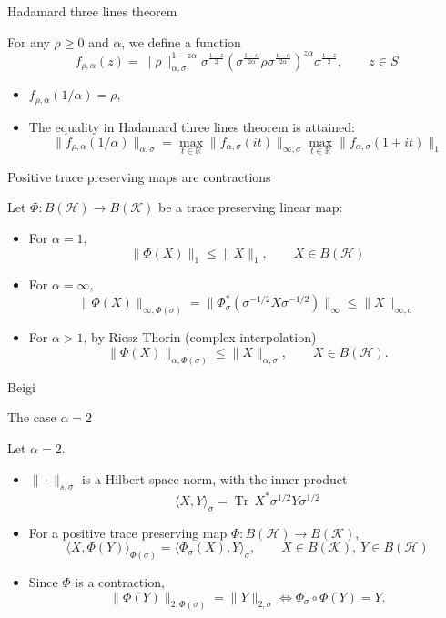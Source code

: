 \documentclass[mathserif]{beamer}
\newcommand{\<}{\langle}
\renewcommand{\>}{\rangle}
\newcommand{\Tr}{\operatorname{Tr}\,}
\newcommand{\Ha}{\mathcal H}
\newcommand{\Ka}{\mathcal K}
\begin{document}
\begin{frame}{Hadamard three lines theorem}

 For any $\rho\ge 0$  and $\alpha$, we define a function 
\[
f_{\rho,\alpha}(z)=
\|\rho\|_{\alpha,\sigma}^{1-z\alpha}\sigma^{\frac{1-z}2}\left(\sigma^{\frac{1-\alpha}{2\alpha}}\rho\sigma^{\frac{1-\alpha}{2\alpha}}\right)^{z\alpha}\sigma^{\frac{1-z}2},\qquad
z\in S
\]

\begin{itemize}
\item $f_{\rho,\alpha}(1/\alpha)=\rho$,
\item The equality in Hadamard three lines theorem is attained:
\[
\|f_{\rho,\alpha}(1/\alpha)\|_{\alpha,\sigma}= \max_{t\in \mathbb R}
\|f_{\alpha,\sigma}(it)\|_{\infty,\sigma}\max_{t\in \mathbb
R}\|f_{\alpha,\sigma}(1+it)\|_1
\]

\end{itemize}


\end{frame}

\begin{frame}{Positive trace preserving maps are contractions}

Let $\Phi:B(\Ha)\to B(\Ka)$ be a  trace preserving linear map:
\bigskip

\begin{itemize}
\item For $\alpha=1$,
\[
\|\Phi(X)\|_1\le \|X\|_1,\qquad X\in B(\Ha)
\]
\item For $\alpha=\infty$,
\[
\|\Phi(X)\|_{\infty,\Phi(\sigma)}=\|\Phi_\sigma^*(\sigma^{-1/2}X\sigma^{-1/2})\|_{\infty}\le
\|X\|_{\infty,\sigma}
\]
\item For $\alpha>1$, by Riesz-Thorin (complex interpolation)
\[
\|\Phi(X)\|_{\alpha,\Phi(\sigma)}\le \|X\|_{\alpha,\sigma},\qquad X\in B(\Ha).
\]
\end{itemize}

Beigi

\end{frame}



\begin{frame}{The case $\alpha=2$}

Let $\alpha=2$.
\medskip

\begin{itemize}
\item $\|\cdot\|_{s,\sigma}$ is a Hilbert space norm, with the inner product
\[
\<X,Y\>_\sigma= \Tr X^*\sigma^{1/2}Y\sigma^{1/2}
\]
\item For a positive trace preserving map $\Phi:B(\Ha)\to B(\Ka)$,
\[
\<X,\Phi(Y)\>_{\Phi(\sigma)}=\<\Phi_\sigma(X),Y\>_\sigma,\qquad X\in B(\Ka),\ Y\in  B(\Ha)
\]
\item Since $\Phi$ is a contraction, 
\[
\|\Phi(Y)\|_{2,\Phi(\sigma)}=\|Y\|_{2,\sigma} \iff \Phi_\sigma\circ \Phi(Y)=Y.
\]
\end{itemize}

\end{frame}
\end{document}
